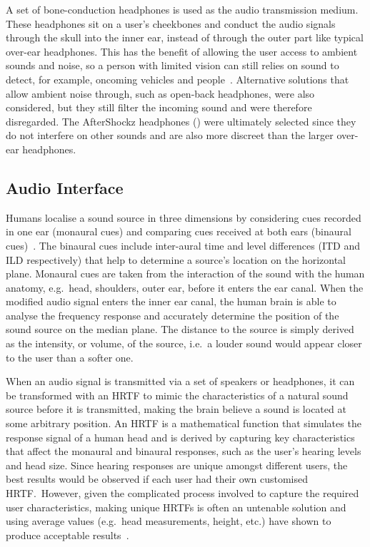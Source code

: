 \documentclass[]{interact}
\begin{document}
A set of bone-conduction headphones is used as the audio transmission medium.
These headphones sit on a user's cheekbones and conduct the audio signals through the skull into the inner ear, instead of through the outer part like typical over-ear headphones. 
This has the benefit of allowing the user access to ambient sounds and noise, so a person with limited vision can still relies on sound to detect, for example, oncoming vehicles and people~\cite{lichtenstein2012headphone}.
Alternative solutions that allow ambient noise through, such as open-back headphones, were also considered, but they still filter the incoming sound and were therefore disregarded.
The AfterShockz headphones () were ultimately selected since they do not interfere on other sounds and are also more discreet than the larger over-ear headphones. 

\subsection{Audio Interface}

Humans localise a sound source in three dimensions by considering cues recorded in one ear (monaural cues) and comparing cues received at both ears (binaural cues)~\cite{blauert1997spatial,blauert1969sound}.
The binaural cues include inter-aural time and level differences (ITD and ILD respectively) that help to determine a source's location on the horizontal plane.
Monaural cues are taken from the interaction of the sound with the human anatomy, e.g.\ head, shoulders, outer ear, before it enters the ear canal.
When the modified audio signal enters the inner ear canal, the human brain is able to analyse the frequency response and accurately determine the position of the sound source on the median plane. 
The distance to the source is simply derived as the intensity, or volume, of the source, i.e.\ a louder sound would appear closer to the user than a softer one. 

When an audio signal is transmitted via a set of speakers or headphones, it can be transformed with an HRTF to mimic the characteristics of a natural sound source before it is transmitted, making the brain believe a sound is located at some arbitrary position.
An HRTF is a mathematical function that simulates the response signal of a human head and is derived by capturing key characteristics that affect the monaural and binaural responses, such as the user's hearing levels and head size.
Since hearing responses are unique amongst different users, the best results would be observed if each user had their own customised HRTF.\
However, given the complicated process involved to capture the required user characteristics, making unique HRTFs is often an untenable solution and using average values (e.g.\ head measurements, height, etc.) have shown to produce acceptable results~\citep{gardner1995hrtf}.
\end{document}
